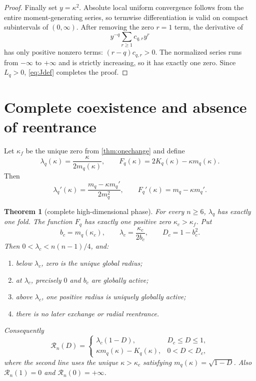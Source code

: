 \documentclass[11pt,a4paper]{article}
\newtheorem{theorem}{Theorem}[section]
\newcommand{\RDF}{\mathcal R}
\begin{document}
\begin{proof}
Finally set $y=\kappa^2$.  Absolute local uniform convergence follows from
the entire moment-generating series, so termwise differentiation is valid on
compact subintervals of $(0,\infty)$.  After removing the zero $r=1$ term,
the derivative of
\[
 y^{-q}\sum_{r\ge1}c_{q,r}y^r
\]
has only positive nonzero terms: $(r-q)c_{q,r}>0$.  The normalized series
runs from $-\infty$ to $+\infty$ and is strictly increasing, so it has exactly
one zero.  Since $L_q>0$, \cref{eq:Jdef} completes the proof.
\end{proof}

\section{Complete coexistence and absence of reentrance}

Let $\kappa_f$ be the unique zero from \cref{thm:onechange} and define
\[
 \lambda_q(\kappa)=\frac{\kappa}{2m_q(\kappa)},
 \qquad F_q(\kappa)=2K_q(\kappa)-\kappa m_q(\kappa).
\]
Then
\begin{equation}\label{eq:phase_derivatives}
 \lambda_q'(\kappa)=
 \frac{m_q-\kappa m_q'}{2m_q^2},
 \qquad F_q'(\kappa)=m_q-\kappa m_q'.
\end{equation}

\begin{theorem}[complete high-dimensional phase]\label{thm:completephase}
For every $n\ge6$, $\lambda_q$ has exactly one fold.  The function $F_q$ has
exactly one positive zero $\kappa_c>\kappa_f$.  Put
\[
 b_c=m_q(\kappa_c),\qquad
 \lambda_c=\frac{\kappa_c}{2b_c},\qquad D_c=1-b_c^2.
\]
Then $0<\lambda_c<n(n-1)/4$, and:
\begin{enumerate}
\item below $\lambda_c$, zero is the unique global radius;
\item at $\lambda_c$, precisely $0$ and $b_c$ are globally active;
\item above $\lambda_c$, one positive radius is uniquely globally active;
\item there is no later exchange or radial reentrance.
\end{enumerate}
Consequently
\begin{equation}\label{eq:twopiece}
 \RDF_n(D)=
 \begin{cases}
  \lambda_c(1-D),&D_c\le D\le1,\\[1mm]
  \kappa m_q(\kappa)-K_q(\kappa),&0<D<D_c,
 \end{cases}
\end{equation}
where the second line uses the unique $\kappa>\kappa_c$ satisfying
$m_q(\kappa)=\sqrt{1-D}$.  Also $\RDF_n(1)=0$ and
$\RDF_n(0)=+\infty$.
\end{theorem}
\end{document}
